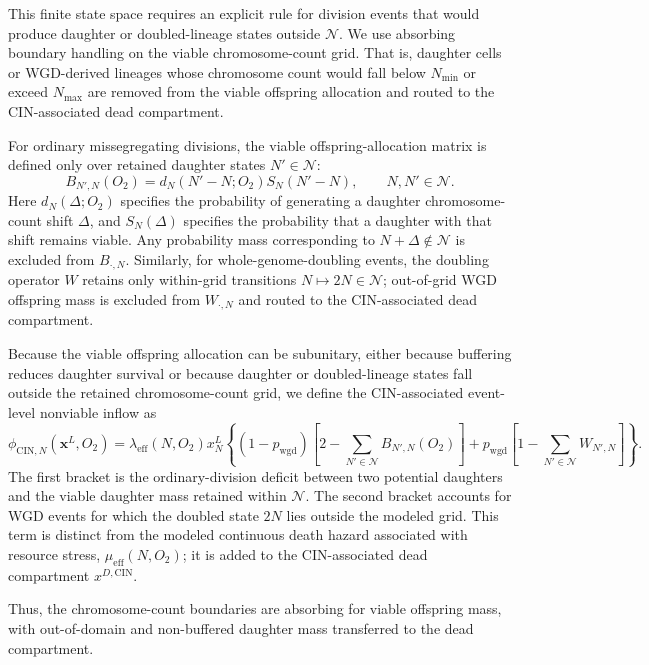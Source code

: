 \documentclass[11pt]{article}
\begin{document}
This finite state space requires an explicit rule for division events that would produce daughter or doubled-lineage states outside $\mathcal{N}$. We use absorbing boundary handling on the viable chromosome-count grid. That is, daughter cells or WGD-derived lineages whose chromosome count would fall below $N_{\min}$ or exceed $N_{\max}$ are removed from the viable offspring allocation and routed to the CIN-associated dead compartment.

For ordinary missegregating divisions, the viable offspring-allocation matrix is defined only over retained daughter states $N'\in\mathcal{N}$:
\[
B_{N',N}(O_2) = d_N(N'-N;O_2)S_N(N'-N), \qquad N,N'\in\mathcal{N}.
\]
Here $d_N(\Delta;O_2)$ specifies the probability of generating a daughter chromosome-count shift $\Delta$, and $S_N(\Delta)$ specifies the probability that a daughter with that shift remains viable. Any probability mass corresponding to $N+\Delta\notin\mathcal{N}$ is excluded from $B_{\cdot,N}$. Similarly, for whole-genome-doubling events, the doubling operator $W$ retains only within-grid transitions $N\mapsto 2N\in\mathcal{N}$; out-of-grid WGD offspring mass is excluded from $W_{\cdot,N}$ and routed to the CIN-associated dead compartment.


Because the viable offspring allocation can be subunitary, either because buffering reduces daughter survival or because daughter or doubled-lineage states fall outside the retained chromosome-count grid, we define the CIN-associated event-level nonviable inflow as
\begin{equation}
\phi_{\mathrm{CIN},N}(\mathbf{x}^L,O_2) = \lambda_{\mathrm{eff}}(N,O_2)x^L_N
\left\{
(1-p_{\mathrm{wgd}})
\left[
2-\sum_{N'\in\mathcal{N}}B_{N',N}(O_2)
\right]
+
p_{\mathrm{wgd}}
\left[
1-\sum_{N'\in\mathcal{N}}W_{N',N}
\right]
\right\}.
\label{eq:appendix_phi_CIN}
\end{equation}
The first bracket is the ordinary-division deficit between two potential daughters and the viable daughter mass retained within $\mathcal{N}$. The second bracket accounts for WGD events for which the doubled state $2N$ lies outside the modeled grid. This term is distinct from the modeled continuous death hazard associated with resource stress, $\mu_{\mathrm{eff}}(N,O_2)$; it is added to the CIN-associated dead compartment $x^{D,\mathrm{CIN}}$.

Thus, the chromosome-count boundaries are absorbing for viable offspring mass, with out-of-domain and non-buffered daughter mass transferred to the dead compartment.
\end{document}
